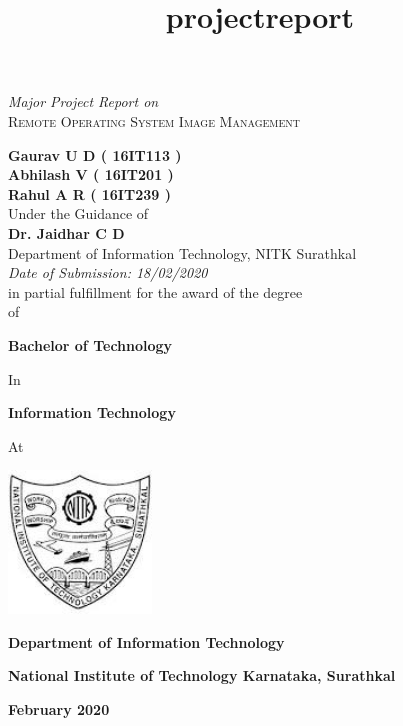 \documentclass[a4paper,12pt]{article}
\title{projectreport}
\begin{document}
\thispagestyle{empty}
\begin{center}
\textit{Major Project Report on} \\
\vspace{2 mm}
\Large{\textsc{ Remote Operating System Image Management }}   %

\vspace{7 mm}
\large{\textbf{                  %
Gaurav U D ( 16IT113 )  
\\Abhilash V ( 16IT201 )   
\\Rahul A R ( 16IT239 ) 
}}
\\
\vspace{4 mm}
Under the Guidance of\\
\textbf{Dr. Jaidhar C D}\\         %
Department of Information Technology, NITK Surathkal\\
\vspace{4 mm}
\textit{Date of Submission: 18/02/2020}
\\
\vspace{4 mm}
in partial fulfillment for the award of the degree
\\

of

\textbf{Bachelor of Technology}

In

\textbf{Information Technology}

At
\vspace{4 mm}
    
        \includegraphics[width=1.5in,height=1.5in]
        {nitk.jpg}
 
\textbf{Department of Information Technology}

\textbf{National Institute of Technology Karnataka, Surathkal}

\textbf{February 2020}
\end{center}

\end{document}
